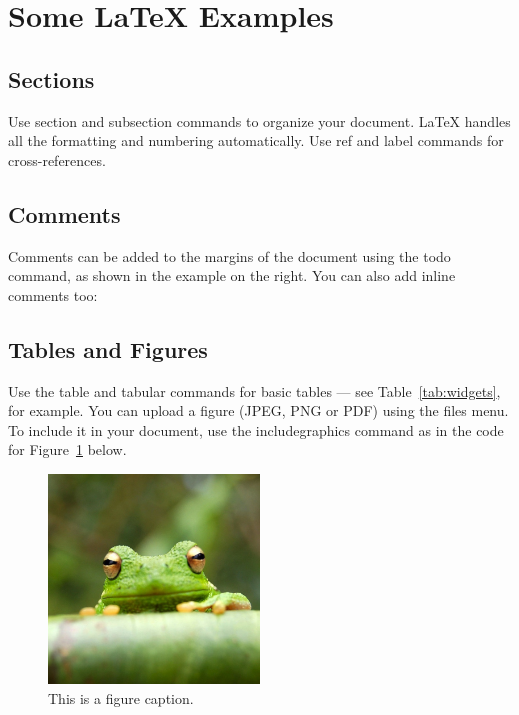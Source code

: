 \section{Some \LaTeX{} Examples}
\label{sec:examples}

\subsection{Sections}

Use section and subsection commands to organize your document. \LaTeX{} handles all the formatting and numbering automatically. Use ref and label commands for cross-references.

\subsection{Comments}

Comments can be added to the margins of the document using the  todo command, as shown in the example on the right. You can also add inline comments too:


\subsection{Tables and Figures}

Use the table and tabular commands for basic tables --- see Table~\ref{tab:widgets}, for example. You can upload a figure (JPEG, PNG or PDF) using the files menu. To include it in your document, use the includegraphics command as in the code for Figure~\ref{fig:frog} below.

\begin{figure}
\centering
\includegraphics[width=0.5\textwidth]{frog.jpg}
\caption{\label{fig:frog}This is a figure caption.}
\end{figure}

